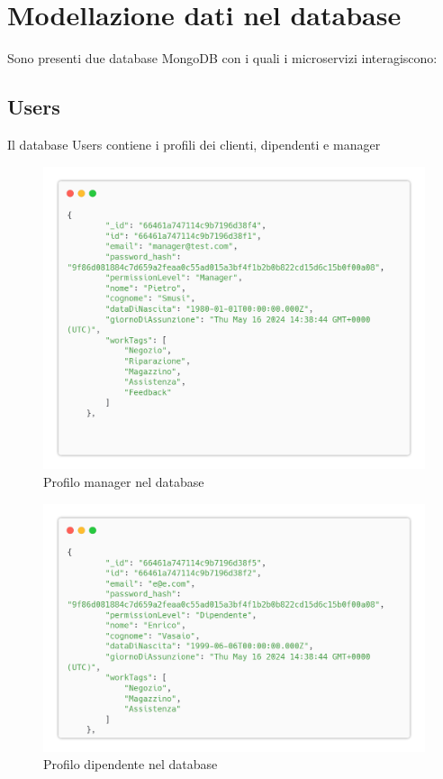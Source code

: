\documentclass{report}
\begin{document}
\section{Modellazione dati nel database}
Sono presenti due database MongoDB con i quali i microservizi interagiscono:
\subsection*{Users}
Il database Users contiene i profili dei clienti, dipendenti e manager
\begin{figure}[H]
	\centering\includegraphics[width=1\textwidth]{images/database/manager.png}
	\caption{Profilo manager nel database}
\end{figure}
\begin{figure}[H]
	\centering\includegraphics[width=1\textwidth]{images/database/dipendente.png}
	\caption{Profilo dipendente nel database}
\end{figure}
\end{document}
